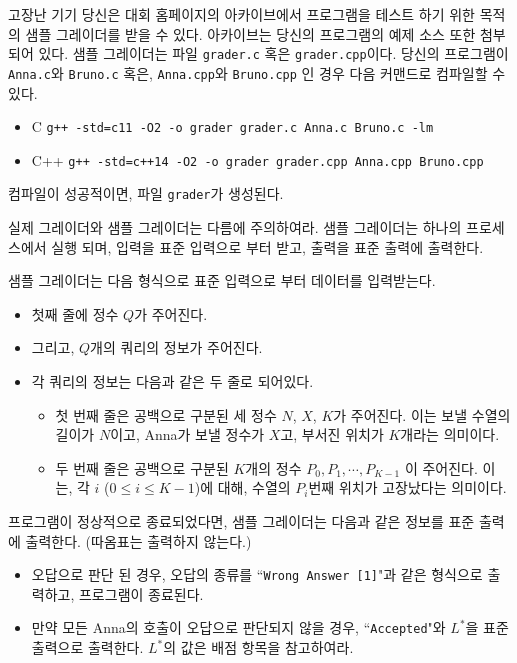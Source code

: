\begin{problem}{고장난 기기}
	당신은 대회 홈페이지의 아카이브에서 프로그램을 테스트 하기 위한 목적의 샘플 그레이더를 받을 수 있다. 아카이브는 당신의 프로그램의 예제 소스 또한 첨부되어 있다.
	샘플 그레이더는 파일 \texttt{grader.c} 혹은 \texttt{grader.cpp}이다. 당신의 프로그램이 \texttt{Anna.c}와 \texttt{Bruno.c} 혹은, \texttt{Anna.cpp}와 \texttt{Bruno.cpp} 인 경우 다음 커맨드로 컴파일할 수 있다.
	
	\begin{itemize}
		\item C
		\texttt{g++ -std=c11 -O2 -o grader grader.c Anna.c Bruno.c -lm}
		\item C++
		\texttt{g++ -std=c++14 -O2 -o grader grader.cpp Anna.cpp Bruno.cpp }
	\end{itemize}
	
	컴파일이 성공적이면, 파일 \texttt{grader}가 생성된다.
	
	실제 그레이더와 샘플 그레이더는 다름에 주의하여라. 샘플 그레이더는 하나의 프로세스에서 실행 되며, 입력을 표준 입력으로 부터 받고, 출력을 표준 출력에 출력한다.
	
	\InputFile
	
	샘플 그레이더는 다음 형식으로 표준 입력으로 부터 데이터를 입력받는다.
	
	\begin{itemize}
		\item 첫째 줄에 정수 $Q$가 주어진다.
		\item 그리고, $Q$개의 쿼리의 정보가 주어진다.
		\item 각 쿼리의 정보는 다음과 같은 두 줄로 되어있다.
		\begin{itemize}
			\item 첫 번째 줄은 공백으로 구분된 세 정수 $N$, $X$, $K$가 주어진다. 이는 보낼 수열의 길이가 $N$이고, Anna가 보낼 정수가 $X$고, 부서진 위치가 $K$개라는 의미이다.
			\item 두 번째 줄은 공백으로 구분된 $K$개의 정수 $P_0,P_1, \cdots, P_{K-1}$ 이 주어진다. 이는, 각 $i$ ($0 \le i \le K-1$)에 대해, 수열의 $P_i$번째 위치가 고장났다는 의미이다.
		\end{itemize}
	\end{itemize}
	
	
	\OutputFile
	
	프로그램이 정상적으로 종료되었다면, 샘플 그레이더는 다음과 같은 정보를 표준 출력에 출력한다. (따옴표는 출력하지 않는다.)
	
	\begin{itemize}
		\item 오답으로 판단 된 경우, 오답의 종류를 ``\texttt{Wrong Answer [1]}"과 같은 형식으로 출력하고, 프로그램이 종료된다.
		\item 만약 모든 Anna의 호출이 오답으로 판단되지 않을 경우,  ``\texttt{Accepted}"와 $L^*$을 표준 출력으로 출력한다. $L^*$의 값은 배점 항목을 참고하여라. 
	\end{itemize}
	

\end{problem}
